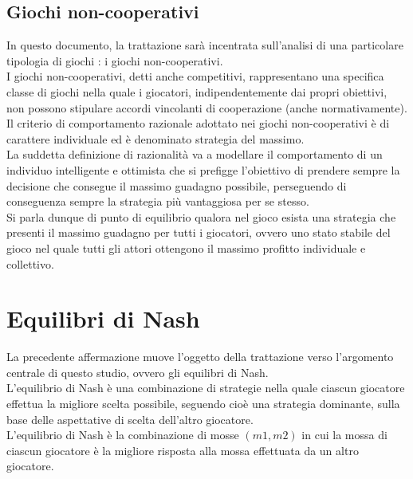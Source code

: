 \subsection{Giochi non-cooperativi}
\justify
In questo documento, la trattazione sarà incentrata sull'analisi di una particolare tipologia di giochi : i giochi non-cooperativi.\\

I giochi non-cooperativi, detti anche competitivi, rappresentano una specifica classe di giochi nella quale i giocatori, indipendentemente dai propri obiettivi, non possono stipulare accordi vincolanti di cooperazione (anche normativamente).\\

Il criterio di comportamento razionale adottato nei giochi non-cooperativi è di carattere individuale ed è denominato strategia del massimo.\\

La suddetta definizione di razionalità va a modellare il comportamento di un individuo intelligente e ottimista che si prefigge l'obiettivo di prendere sempre la decisione che consegue il massimo guadagno possibile, perseguendo di conseguenza sempre la strategia più vantaggiosa per se stesso.\\

Si parla dunque di punto di equilibrio qualora nel gioco esista una strategia che presenti il massimo guadagno per tutti i giocatori, ovvero uno stato stabile del gioco nel quale tutti gli attori ottengono il massimo profitto individuale e collettivo.\\

\section{Equilibri di Nash}
\justify
La precedente affermazione muove l'oggetto della trattazione verso l'argomento centrale di questo studio, ovvero gli equilibri di Nash.\\

L'equilibrio di Nash è una combinazione di strategie nella quale ciascun giocatore effettua la migliore scelta possibile, seguendo cioè una strategia dominante, sulla base delle aspettative di scelta dell'altro giocatore.\\

L'equilibrio di Nash è la combinazione di mosse \((m1, m2)\) in cui la mossa di ciascun giocatore è la migliore risposta alla mossa effettuata da un altro giocatore.\\

